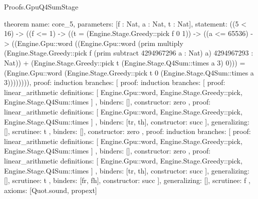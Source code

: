 \begin{lexlean}{Proofs.GpuQ4SumStage}
\begin{semanticmodule}
theorem{
  name: core_5,
  parameters: [f : Nat, a : Nat, t : Nat],
  statement: ((5 < 16) -> ((f <= 1) -> ((t = (Engine.Stage.Greedy::pick f 0 1)) -> ((a <= 65536) -> ((Engine.Gpu::word ((Engine.Gpu::word (prim multiply (Engine.Stage.Greedy::pick f (prim subtract 4294967296 a : Nat) a) 4294967293 : Nat)) + (Engine.Stage.Greedy::pick t (Engine.Stage.Q4Sum::times a 3) 0))) = (Engine.Gpu::word (Engine.Stage.Greedy::pick t 0 (Engine.Stage.Q4Sum::times a 3)))))))),
  proof: induction{
    branches: [
      {
        proof: induction{
          branches: [
            {
              proof: linear_arithmetic{
                definitions: [
                  Engine.Gpu::word,
                  Engine.Stage.Greedy::pick,
                  Engine.Stage.Q4Sum::times
                ]
              },
              binders: [],
              constructor: zero
            },
            {
              proof: linear_arithmetic{
                definitions: [
                  Engine.Gpu::word,
                  Engine.Stage.Greedy::pick,
                  Engine.Stage.Q4Sum::times
                ]
              },
              binders: [tr, th],
              constructor: succ
            }
          ],
          generalizing: [],
          scrutinee: t
        },
        binders: [],
        constructor: zero
      },
      {
        proof: induction{
          branches: [
            {
              proof: linear_arithmetic{
                definitions: [
                  Engine.Gpu::word,
                  Engine.Stage.Greedy::pick,
                  Engine.Stage.Q4Sum::times
                ]
              },
              binders: [],
              constructor: zero
            },
            {
              proof: linear_arithmetic{
                definitions: [
                  Engine.Gpu::word,
                  Engine.Stage.Greedy::pick,
                  Engine.Stage.Q4Sum::times
                ]
              },
              binders: [tr, th],
              constructor: succ
            }
          ],
          generalizing: [],
          scrutinee: t
        },
        binders: [fr, fh],
        constructor: succ
      }
    ],
    generalizing: [],
    scrutinee: f
  },
  axioms: [Quot.sound, propext]
}


\end{semanticmodule}
\end{lexlean}

